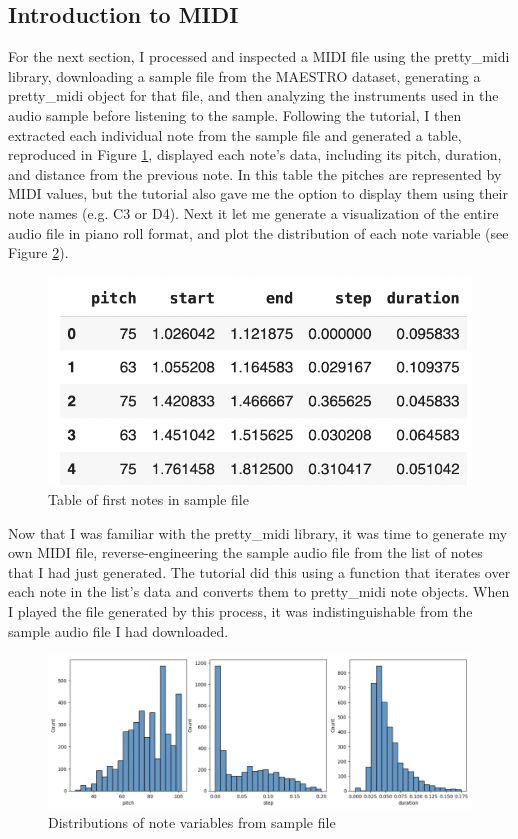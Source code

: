 \documentclass[10pt,twocolumn]{article}
\begin{document}
\subsection{Introduction to MIDI}

For the next section, I processed and inspected a MIDI file using the pretty\_midi library, downloading a sample file from the MAESTRO dataset, generating a pretty\_midi object for that file, and then analyzing the instruments used in the audio sample before listening to the sample. Following the tutorial, I then extracted each individual note from the sample file and generated a table, reproduced in Figure \ref{fig:table}, displayed each note's data, including its pitch, duration, and distance from the previous note. In this table the pitches are represented by MIDI values, but the tutorial also gave me the option to display them using their note names (e.g. C3 or D4). Next it let me generate a visualization of the entire audio file in piano roll format, and plot the distribution of each note variable (see Figure \ref{fig:distributions}).

\begin{figure}
    \centering
    \includegraphics[width=0.75\linewidth]{Table.png}
    \caption{Table of first notes in sample file}
    \label{fig:table}
\end{figure}

Now that I was familiar with the pretty\_midi library, it was time to generate my own MIDI file, reverse-engineering the sample audio file from the list of notes that I had just generated. The tutorial did this using a function that iterates over each note in the list's data and converts them to pretty\_midi note objects. When I played the file generated by this process, it was indistinguishable from the sample audio file I had downloaded.

\begin{figure}
    \centering
    \includegraphics[width=1\linewidth]{Distributions.png}
    \caption{Distributions of note variables from sample file}
    \label{fig:distributions}
\end{figure}
\end{document}
